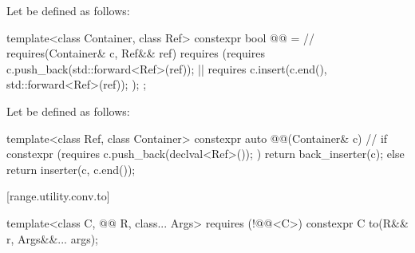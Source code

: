 \pnum
Let  be defined as follows:
\begin{codeblock}
template<class Container, class Ref>
constexpr bool @@ =          // \expos
  requires(Container& c, Ref&& ref) {
    requires (requires { c.push_back(std::forward<Ref>(ref)); } ||
              requires { c.insert(c.end(), std::forward<Ref>(ref)); });
  };
\end{codeblock}

\pnum
Let  be defined as follows:
\begin{codeblock}
template<class Ref, class Container>
constexpr auto @@(Container& c) {                // \expos
  if constexpr (requires { c.push_back(declval<Ref>()); })
    return back_inserter(c);
  else
    return inserter(c, c.end());
}
\end{codeblock}

[range.utility.conv.to]{}

%
\begin{itemdecl}
template<class C, @@ R, class... Args> requires (!@@<C>)
  constexpr C to(R&& r, Args&&... args);
\end{itemdecl}

